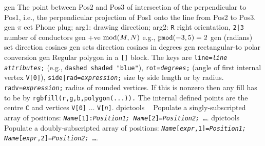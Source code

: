 %
  {gen}%
  {The point between Pos2 and Pos3 of intersection of the perpendicular
   to Pos1, i.e., the perpendicular projection of Pos1 onto the line
   from Pos2 to Pos3.}%
%
  {gen}%
  {$\pi$}%
%
  {cct}%
  {Phone plug; arg1: drawing direction; arg2: {\tt R} right orientation,
   {\tt 2|3} number of conductors}%
%
  {gen}%
  {+ve $\hbox{mod}(M,N)$ e.g., $\hbox{\tt pmod}(-3,5)=2$}%
%
  {gen}%
  {(radians) set direction cosines}%
%
  {gen}%
  {sets direction cosines in degrees }%
%
  {gen}%
  {rectangular-to polar conversion}%
%
  {gen}%
  {Regular polygon in a {\tt []} block. The keys are
    {\tt line={\sl line attributes};} (e.g., {\tt dashed shaded "blue"}),
    {\tt rot={\sl degrees};} (angle of first internal vertex {\tt V[0]}),
    {\tt side|rad={\sl expression};} size by side length or by radius.
    {\tt radv={\sl expression};} radius of rounded vertices. If this is
    nonzero then any fill has to be by {\tt rgbfill(r,g,b,polygon(...)).}
   The internal defined points are the centre {\tt C} and vertices
   {\tt V[0]} $\ldots$ {\tt V[{\sl n}]}. }%
%
  {dpictools}%
  {$\;\;$  Populate a singly-subscripted array of positions:
    {\tt {\sl Name}[1]:{\sl Position1;}
         {\sl Name}[2]={\sl Position2;} \ldots}.}%
%
  {dpictools}%
  {$\;\;$  Populate a doubly-subscripted array of positions:
    {\tt {\sl Name}[{\sl expr},1]={\sl Position1;}
         {\sl Name}[{\sl expr},2]={\sl Position2;} \ldots}.}%

